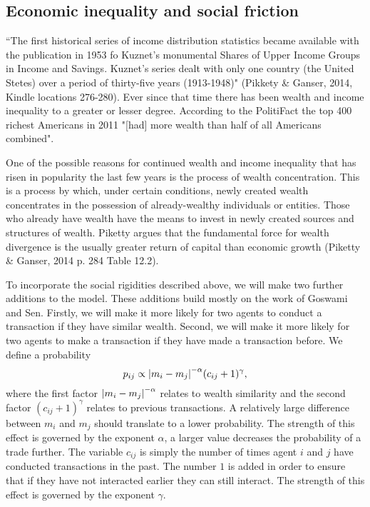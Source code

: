\documentclass[10pt, a4paper]{amsart}
\begin{document}
\subsection{Economic inequality and social friction}
``The first historical series of income distribution statistics became available with the publication in 1953 fo Kuznet's monumental Shares of Upper Income Groups in Income and Savings. Kuznet's series dealt with only one country (the United Stetes) over a period of thirty-five years (1913-1948)" (Pikkety \& Ganser, 2014, Kindle locations 276-280\cite{Piketty}). Ever since that time there has been wealth and income inequality to a greater or lesser degree. According to the PolitiFact the top 400 richest Americans in 2011 "[had] more wealth than half of all Americans combined"\cite{Moore}.

One of the possible reasons for continued wealth and income inequality that has risen in popularity the last few years is the process of wealth concentration. This is a process by which, under certain conditions, newly created wealth concentrates in the possession of already-wealthy individuals or entities. Those who already have wealth have the means to invest in newly created sources and structures of wealth. Piketty argues that the fundamental force for wealth divergence is the usually greater return of capital than economic growth (Piketty \& Ganser, 2014 p. 284 Table 12.2\cite{Piketty}).

To incorporate the social rigidities described above, we will make two further additions to the model. These additions build mostly on the work of Goswami and Sen\cite{GoswamiSen}. Firstly, we will make it more likely for two agents to conduct a transaction if they have similar wealth. Second, we will make it more likely for two agents to make a transaction if they have made a transaction before. We define a probability
\begin{equation}
\label{eq:rigidprob}
p_{ij} \propto \abs{m_i - m_j}^{-\alpha}(c_{ij}+1)^{\gamma},
\end{equation}
where the first factor $\abs{m_i-m_j}^{-\alpha}$ relates to wealth similarity and the second factor $(c_{ij}+1)^{\gamma}$ relates to previous transactions. A relatively large difference between $m_i$ and $m_j$ should translate to a lower probability. The strength of this effect is governed by the exponent $\alpha$, a larger value decreases the probability of a trade further. The variable $c_{ij}$ is simply the number of times agent $i$ and $j$ have conducted transactions in the past. The number $1$ is added in order to ensure that if they have not interacted earlier they can still interact. The strength of this effect is governed by the exponent $\gamma$.
\end{document}
